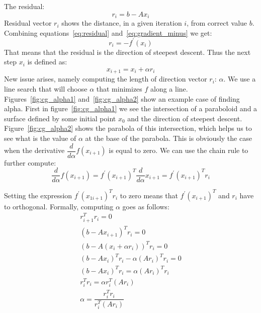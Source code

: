\documentclass[en]{minipw} %
\begin{document}
The residual:
\begin{equation}
\label{eq:residual}
r_i = b - Ax_i
\end{equation}
Residual vector $r_i$ shows the distance, in a given iteration $i$, from correct value $b$.
Combining equations~\ref{eq:residual} and~\ref{eq:gradient_minus} we get:
\begin{equation}
r_i = -f^{'}(x_i)
\end{equation}
That means that the residual is the direction of steepest descent. Thus the next step $x_i$ is defined as:
\begin{equation}
x_{i+1} = x_{i} + \alpha r_{i}
\end{equation}
New issue arises, namely computing the length of direction vector $r_{i}$: $\alpha$.
We use a line search that will choose $\alpha$ that minimizes $f$ along a line. Figures~\ref{fig:cg_alpha1} and~\ref{fig:cg_alpha2} show an example case of finding alpha. First in figure~\ref{fig:cg_alpha1} we see the intersection of a paraboloid and a surface defined by some initial point $x_0$ and the direction of steepest descent. Figure~\ref{fig:cg_alpha2} shows the parabola of this intersection, which helps us to see what is the value of $\alpha$ at the base of the parabola. This is obviously the case when the derivative $\dfrac{d}{d\alpha}f(x_{i+1})$ is equal to zero. We can use the chain rule to further compute:
\begin{equation}
\dfrac{d}{d \alpha}f(x_{i+1}) = f^{'}(x_{i+1})^{T} \dfrac{d}{d \alpha} x_{i+1} = f^{'}(x_{i+1})^{T} r_i
\end{equation}

Setting the expression $f^{'}(x_{1i+1})^{T} r_i$ to zero means that $f^{'}(x_{i+1})^{T}$ and  $r_i$ have to orthogonal.
Formally, computing $\alpha$ goes as follows:
\begin{equation}
\begin{aligned}
r^{T}_{i+1}r_{i} = 0
\\
(b - Ax_{i+1})^{T}r_{i} = 0
\\
(b - A(x_{i} + \alpha r_{i}))^{T}r_{i} = 0
\\
(b - Ax_{i})^{T}r_{i} - \alpha (Ar_{i})^{T}r_{i}= 0
\\
(b - Ax_{i})^{T}r_{i} = \alpha (Ar_{i})^{T}r_{i}
\\
r_{i}^{T}r_{i} = \alpha r_{i}^{T} (Ar_{i})
\\
\alpha = \dfrac{r_{i}^{T}r_{i}}{r_{i}^{T} (Ar_{i})}
\end{aligned}
\end{equation}
\end{document}

